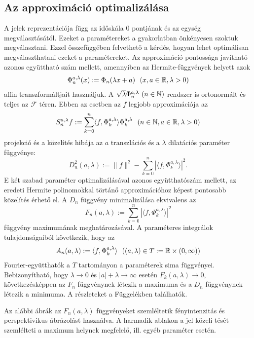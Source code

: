\documentclass[oneside,titlepage,12pt,a4paper]{report}
\begin{document}
\subsection{Az approximáció optimalizálása} \label{subsec::apropt}

A jelek reprezentációja  függ az időskála $0$ pontjának és az egység
megválasztásától. Ezeket a paramétereket  a gyakorlatban önkényesen szoktuk
 megválasztani. Ezzel összefüggében felvethető a kérdés, hogyan lehet optimálisan megválaszthatani  ezeket a paramétereket.
Az  approximáció pontossága javítható azonos együttható szám mellett, amennyiben az  Hermite-függvények helyett azok
\begin{equation}
\Phi_n^{a,\lambda}(x):=\Phi_n(\lambda x+a)\ \  (x,a\in\Bbb R, \lambda>0)
\end{equation}
affin transzformáltjait használjuk. A $\sqrt{\lambda}\Phi_n^{a,\lambda}\ (n\in\Bbb N)$ rendszer is ortonormált és teljes az $\mathcal F$ téren. Ebben az esetben
az $f$ legjobb approximációja az
\begin{equation}
S_n^{a,\lambda}f:=\sum_{k=0}^n\langle f,\Phi_k^{a,\lambda}\rangle\Phi_k^{a,\lambda}\ \
(n\in\Bbb N, a\in\Bbb R,\lambda>0)
\end{equation} \label{eq:hilaprx}
projekció és a közelítés hibája az $a$ transzlációs és a $\lambda$ dilatációs paraméter függvénye:
\begin{equation}
D^2_n(a,\lambda):=\|f\|^2-\sum_{k=0}^n|\langle f,\Phi_k^{a,\lambda}\rangle|^2.
\end{equation}
            E két szabad paraméter optimalizálásával azonos együtthatószám mellett, az eredeti Hermite polinomokkal törtánő  approximációhoz képest pontosabb közelítés érhető el. A $D_n$ függvény minimalizálása ekvivalens  az
 $$
 F_n(a,\lambda):=\sum_{k=0}^n|\langle f,\Phi_k^{a,\lambda}\rangle|^2
 $$
 függvény maximumának meghatározásával. A paraméteres integrálok tulajdonságaiból következik, hogy az
 $$
 A_n(a,\lambda):=\langle f,\Phi_k^{a,\lambda}\rangle \ \  ((a,\lambda)\in T:=\Bbb R\times (0,\infty))
 $$
 Fourier-együtthatók a $T$ tartományon a paraméterek sima függvényei. Bebizonyítható, hogy $\lambda\to 0$ és $|a|+\lambda\to \infty$ esetén
 $F_k(a,\lambda)\to 0$, következésképpen az $F_n$ függvénynek létezik a
 maximuma és a $D_n$ függvénynek létezik a minimuma. A részleteket a Függelékben találhatók.

 Az alábbi ábrák az $F_n(a,\lambda)$ függvényeket szemléltetik fényintenzitás és perspektivikus ábrázolást használva. A harmadik ablakon
a jel közelí tését szemlélteti a maximum helynek megfelelő, ill.  egyéb
paraméter esetén.
\end{document}
